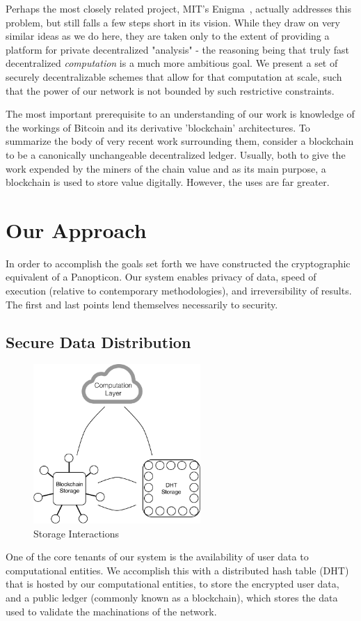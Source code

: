 \documentclass[journal,11pt]{IEEEtran}
\begin{document}
\par Perhaps the most closely related project, MIT's Enigma~\cite{Zyskind2015}, actually addresses this problem, but still falls a few steps short in its vision. While they draw on very similar ideas as we do here, they are taken only to the extent of providing a platform for private decentralized "analysis" - the reasoning being that truly fast decentralized \textit{computation} is a much more ambitious goal. We present a set of securely decentralizable schemes that allow for that computation at scale, such that the power of our network is not bounded by such restrictive constraints.

\par The most important prerequisite to an understanding of our work is knowledge of the workings of Bitcoin and its derivative 'blockchain' architectures. To summarize the body of very recent work surrounding them, consider a blockchain to be a canonically unchangeable decentralized ledger. Usually, both to give the work expended by the miners of the chain value and as its main purpose, a blockchain is used to store value digitally. However, the uses are far greater.

\section{Our Approach}
\par In order to accomplish the goals set forth we have constructed the cryptographic equivalent of a Panopticon. Our system enables privacy of data, speed of execution (relative to contemporary methodologies), and irreversibility of results. The first and last points lend themselves necessarily to security.


\subsection{Secure Data Distribution}
\begin{figure}
  \centering
  \includegraphics[width=2.5in]{figs/storageInteractions}
  \caption{Storage Interactions}
  \label{storage}
\end{figure}
\par One of the core tenants of our system is the availability of user data to computational entities. We accomplish this with a distributed hash table (DHT) that is hosted by our computational entities, to store the encrypted user data, and a public ledger (commonly known as a blockchain), which stores the data used to validate the machinations of the network.
\end{document}
